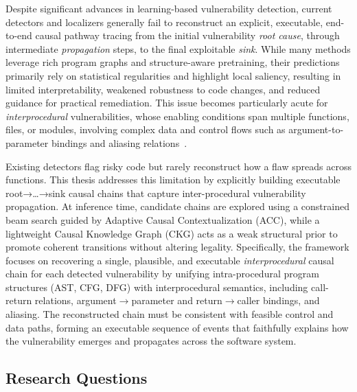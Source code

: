 \documentclass{buthesis}
\begin{document}
Despite significant advances in learning-based vulnerability detection, current detectors and localizers generally fail to reconstruct an explicit, executable, end-to-end causal pathway tracing from the initial vulnerability \emph{root cause}, through intermediate \emph{propagation} steps, to the final exploitable \emph{sink}. While many methods leverage rich program graphs and structure-aware pretraining, their predictions primarily rely on statistical regularities and highlight local saliency, resulting in limited interpretability, weakened robustness to code changes, and reduced guidance for practical remediation. This issue becomes particularly acute for \emph{interprocedural} vulnerabilities, whose enabling conditions span multiple functions, files, or modules, involving complex data and control flows such as argument-to-parameter bindings and aliasing relations~\cite{Li2022Empirical,Le2024MBU,yang2022natural}.


Existing detectors flag risky code but rarely reconstruct how a flaw spreads across functions. This thesis addresses this limitation by explicitly building executable root→…→sink causal chains that capture inter-procedural vulnerability propagation. At inference time, candidate chains are explored using a constrained beam search guided by Adaptive Causal Contextualization (ACC), while a lightweight Causal Knowledge Graph (CKG) acts as a weak structural prior to promote coherent transitions without altering legality. Specifically, the framework focuses on recovering a single, plausible, and executable \emph{interprocedural} causal chain for each detected vulnerability by unifying intra-procedural program structures (AST, CFG, DFG) with interprocedural semantics, including call-return relations, argument$\rightarrow$parameter and return$\rightarrow$caller bindings, and aliasing. The reconstructed chain must be consistent with feasible control and data paths, forming an executable sequence of events that faithfully explains how the vulnerability emerges and propagates across the software system.


\subsection{Research Questions}
\end{document}
